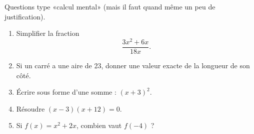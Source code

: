 
\begin{exercice}\label{exosmath-0568}

    Questions type «calcul mental» (mais il faut quand même un peu de justification).
    \begin{enumerate}
        \item
            Simplifier la fraction
            \begin{equation*}
                \frac{ 3x^2+6x }{ 18x }.
            \end{equation*}
        \item
            Si un carré a une aire de \unit{23}{\centi\square\meter}, donner une valeur exacte de la longueur de son côté.
        \item
            Écrire sous forme d'une somme : \( (x+3)^2\).
        \item
            Résoudre \( (x-3)(x+12)=0\).
        \item 
            Si \( f(x)=x^2+2x\), combien vaut \( f(-4)\) ?
    \end{enumerate}

\end{exercice}
